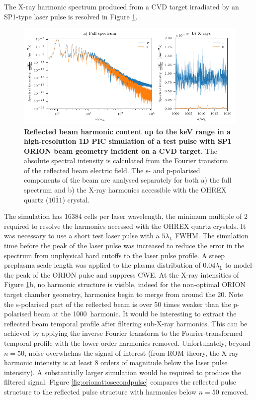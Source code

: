 The X-ray harmonic spectrum produced from a CVD target irradiated by an SP1-type laser pulse is resolved in Figure \ref{fig:orionxrayharmonics}.
\begin{figure}
	\centering
	\includegraphics{figures/orion/orion_xray_harmonics}
	\caption[Reflected beam harmonic content up to the keV range in a high-resolution 1D PIC simulation.]{\textbf{Reflected beam harmonic content up to the keV range in a high-resolution 1D PIC simulation of a test pulse with SP1 ORION beam geometry incident on a CVD target.} The absolute spectral intensity is calculated from the Fourier transform of the reflected beam electric field. The s- and p-polarised components of the beam are analysed separately for both a) the full spectrum and b) the X-ray harmonics accessible with the OHREX quartz ($10\bar{1}1$) crystal.}
	\label{fig:orionxrayharmonics}
\end{figure}
The simulation has 16384 cells per laser wavelength, the minimum multiple of 2 required to resolve the harmonics accessed with the OHREX quartz crystals. It was necessary to use a short test laser pulse with a $5\lambda_\mathrm{L}$ FWHM. The simulation time before the peak of the laser pulse was increased to reduce the error in the spectrum from unphysical hard cutoffs to the laser pulse profile. A steep preplasma scale length was applied to the plasma distribution of $0.04\lambda_\mathrm{L}$ to model the peak of the ORION pulse and suppress \ac{CWE}. 
At the X-ray intensities of Figure \ref{fig:orionxrayharmonics}b, no harmonic structure is visible, indeed for the non-optimal ORION target chamber geometry, harmonics begin to merge from around the 20\th . Note the s-polarised part of the reflected beam is over 50 times weaker than the p-polarised beam at the 1000\th\ harmonic.
It would be interesting to extract the reflected beam temporal profile after filtering sub-X-ray harmonics. This can be achieved by applying the inverse Fourier transform to the Fourier-transformed temporal profile with the lower-order harmonics removed. Unfortunately, beyond $n=50$, noise overwhelms the signal of interest (from ROM theory, the X-ray harmonic intensity is at least 8 orders of magnitude below the laser pulse intensity). A substantially larger simulation would be required to produce the filtered signal. Figure \ref{fig:orionattosecondpulse} compares the reflected pulse structure to the reflected pulse structure with harmonics below $n = 50$ removed. 

